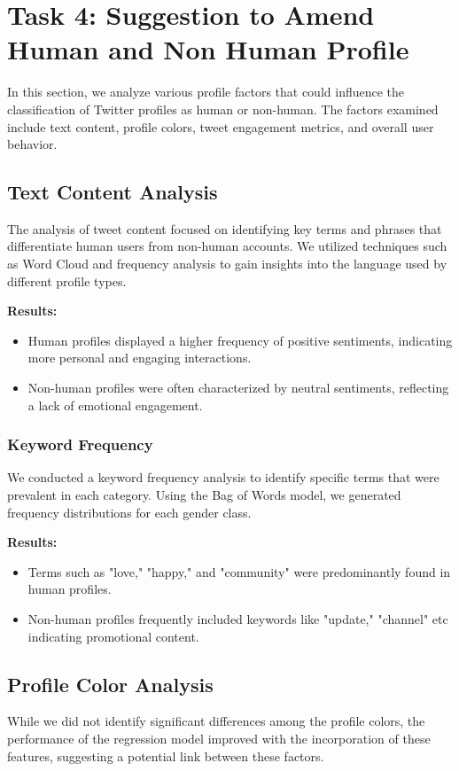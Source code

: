 \documentclass[a4paper,11pt]{article}
\begin{document}
\FloatBarrier


\section{Task 4: Suggestion to Amend Human and Non Human Profile}

In this section, we analyze various profile factors that could influence the classification of Twitter profiles as human or non-human. The factors examined include text content, profile colors, tweet engagement metrics, and overall user behavior.

\subsection{Text Content Analysis}
The analysis of tweet content focused on identifying key terms and phrases that differentiate human users from non-human accounts. We utilized techniques such as Word Cloud and frequency analysis to gain insights into the language used by different profile types.

\textbf{Results:}
\begin{itemize}
    \item Human profiles displayed a higher frequency of positive sentiments, indicating more personal and engaging interactions.
    \item Non-human profiles were often characterized by neutral sentiments, reflecting a lack of emotional engagement.
\end{itemize}

\subsubsection*{Keyword Frequency}
We conducted a keyword frequency analysis to identify specific terms that were prevalent in each category. Using the Bag of Words model, we generated frequency distributions for each gender class.

\textbf{Results:}
\begin{itemize}
    \item Terms such as "love," "happy," and "community" were predominantly found in human profiles.
    \item Non-human profiles frequently included keywords like "update," "channel" etc indicating promotional content.
\end{itemize}

\subsection{Profile Color Analysis} 
While we did not identify significant differences among the profile colors, the performance of the regression model improved with the incorporation of these features, suggesting a potential link between these factors.
\end{document}
